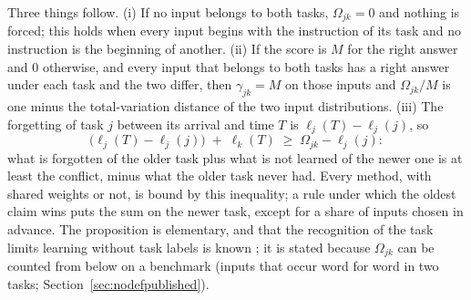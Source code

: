 Three things follow. (i) If no input belongs to both tasks, $\Omega_{jk} = 0$ and nothing is forced; this holds when every input begins with the instruction of its task and no instruction is the beginning of another. (ii) If the score is $M$ for the right answer and $0$ otherwise, and every input that belongs to both tasks has a right answer under each task and the two differ, then $\gamma_{jk} = M$ on those inputs and $\Omega_{jk}/M$ is one minus the total-variation distance of the two input distributions. (iii) The forgetting of task $j$ between its arrival and time $T$ is $\ell_j(T) - \ell_j(j)$, so
\[
  \bigl(\ell_j(T) - \ell_j(j)\bigr) \;+\; \ell_k(T) \;\ge\; \Omega_{jk} - \ell_j(j) :
\]
what is forgotten of the older task plus what is not learned of the newer one is at least the conflict, minus what the older task never had. Every method, with shared weights or not, is bound by this inequality; a rule under which the oldest claim wins puts the sum on the newer task, except for a share of inputs chosen in advance. The proposition is elementary, and that the recognition of the task limits learning without task labels is known \citep{kim2022theoretical}; it is stated because $\Omega_{jk}$ can be counted from below on a benchmark (inputs that occur word for word in two tasks; Section~\ref{sec:nodefpublished}).

